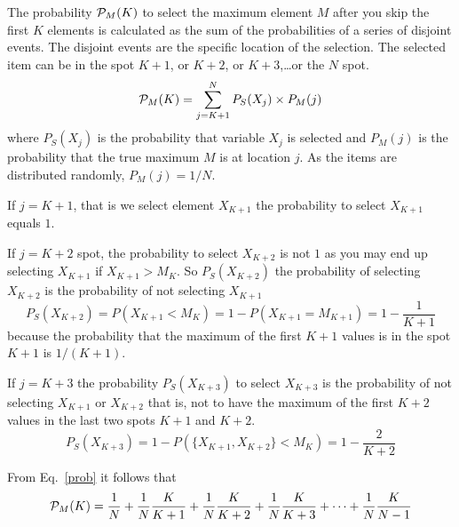 \documentclass[preprint]{revtex4}
\begin{document}
The probability ${\cal P}_M(K)$ to select the maximum element $M$ after
you skip the first $K$ elements is calculated as the sum of the
probabilities of a series of disjoint events.  The disjoint events are
the specific location of the selection.  The selected item can be in
the spot $K+1$, or $K+2$, or $K+3$,\ldots or the $N$ spot. 
\begin{equation}
  \label{prob}
  {\cal P}_M(K) = \sum_{j=K+1}^{N} P_S(X_j) \times P_M(j)
\end{equation}
where $P_S(X_j)$ is the probability that variable $X_j$ is selected and
$P_M(j)$ is the probability that the true maximum $M$ is at location $j$.
As the items are distributed randomly, $P_M(j)=1/N$.

If $j=K+1$, that is we select element $X_{K+1}$ the probability to
select $X_{K+1}$ equals $1$.

If $j=K+2$ spot, the probability to select $X_{K+2}$ is not $1$ as you
may end up selecting $X_{K+1}$ if $X_{K+1}>M_K$.  So $P_S(X_{K+2})$
the probability of selecting $X_{K+2}$ is the probability of not
selecting $X_{K+1}$
$$P_S(X_{K+2}) = P(X_{K+1} < M_K) = 1-P(X_{K+1}=M_{K+1}) =
1 - \frac{1}{K+1}$$
because the probability that the maximum of the first $K+1$ values is
in the spot $K+1$ is $1/(K+1)$.

If $j=K+3$ the probability $P_S(X_{K+3})$ to select $X_{K+3}$ is the
probability of not selecting $X_{K+1}$ or $X_{K+2}$ that is, not to have
the maximum of the first $K+2$ values in the last two spots $K+1$ and
$K+2$.
$$P_S(X_{K+3}) = 1-P(\{X_{K+1}, X_{K+2}\}<M_K) = 1 - \frac{2}{K+2}$$ 

From Eq.\ \ref{prob} it follows that
\begin{equation}
  {\cal P}_M(K) = \frac{1}{N} + \frac{1}{N}\frac{K}{K+1}
  + \frac{1}{N}\frac{K}{K+2} 
  + \frac{1}{N}\frac{K}{K+3} 
  + \cdots + \frac{1}{N}\frac{K}{N-1} 
\end{equation}



\begin{equation}
\end{equation}
\end{document}
